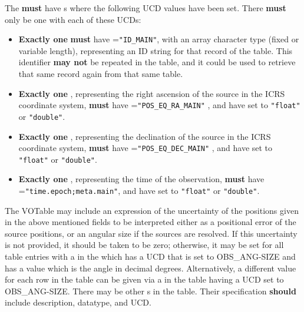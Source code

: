 \documentclass[11pt,a4paper]{ivoa} 
\begin{document}
The  \textbf{must} have s where the following
UCD values have been set. There \textbf{must} only be one 
with each of these UCDs: \begin{itemize} \item \textbf{Exactly one}
 \textbf{must} have =\texttt{"ID\_MAIN"}, with
an array character type (fixed or variable length), representing an ID
string for that record of the table. This identifier \textbf{may not} be
repeated in the table, and it could be used to retrieve that same record
again from that same table.  \item \textbf{Exactly one} ,
representing the right ascension of the source in the ICRS coordinate
system, \textbf{must} have =\texttt{"POS\_EQ\_RA\_MAIN"}
, and have
 set to \texttt{"float"} or \texttt{"double"}.  \item
\textbf{Exactly one} , representing the declination of the
source in the ICRS coordinate system, \textbf{must} have
=\texttt{"POS\_EQ\_DEC\_MAIN"} , and have  set to \texttt{"float"}
or \texttt{"double"}.  \item \textbf{Exactly one} ,
representing the time of the observation, \textbf{must} have
=\texttt{"time.epoch;meta.main"}, and have 
set to \texttt{"float"} or \texttt{"double"}. 

\end{itemize}

The VOTable may include an expression of the uncertainty of the
positions given in the above mentioned fields to be interpreted either
as a positional error of the source positions, or an angular size if the
sources are resolved. If this uncertainty is not provided, it should be
taken to be zero; otherwise, it may be set for all table entries with a
 in the  which has a UCD that is set to
OBS\_ANG-SIZE  and has a value which is
the angle in decimal degrees. Alternatively, a different value for each
row in the table can be given via a  in the table having a
UCD set to OBS\_ANG-SIZE.  There may be other s in the
table. Their specification \textbf{should} include description,
datatype, and UCD.
 
\end{document}
